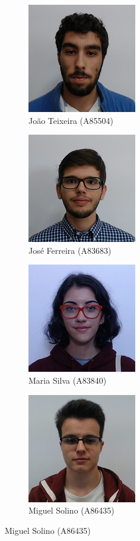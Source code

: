 \documentclass[a4paper]{report}
\begin{document}
\begin{figure}[H]
\centering
\begin{subfigure}{.5\textwidth}
  \centering
  \includegraphics[width=.25\linewidth]{images/A85504.jpeg}
    \caption{João Teixeira (A85504)}
\end{subfigure}%
\begin{subfigure}{.5\textwidth}
  \centering
  \includegraphics[width=.25\linewidth]{images/A83683.jpeg}
    \caption{José Ferreira (A83683)}
\end{subfigure}
\begin{subfigure}{.5\textwidth}
  \centering
  \includegraphics[width=.25\linewidth]{images/A83840.jpeg}
    \caption{Maria Silva (A83840)}
\end{subfigure}%
\begin{subfigure}{.5\textwidth}
  \centering
  \includegraphics[width=.25\linewidth]{images/A86435.jpeg}
    \caption{Miguel Solino (A86435)}
\end{subfigure}
\end{figure}

\tableofcontents
\end{document}
